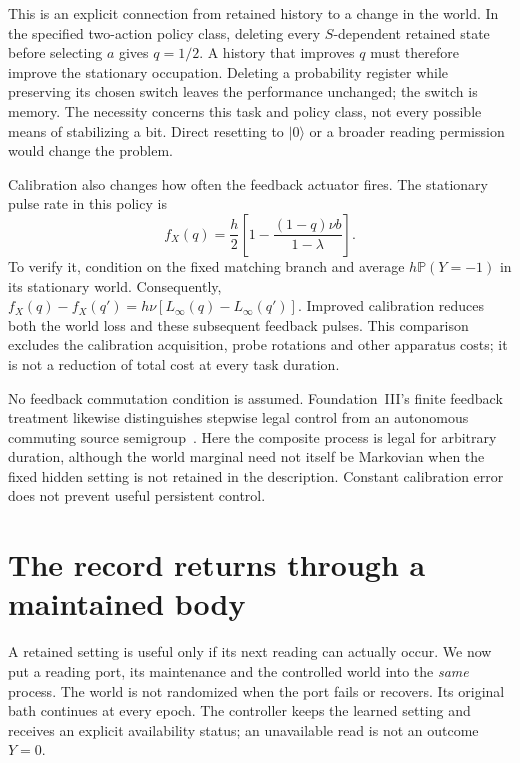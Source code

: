 \documentclass[11pt,a4paper]{article}
\newcommand{\Prb}{\mathbb P}
\begin{document}
This is an explicit connection from retained history to a change in the world. In the specified two-action policy class, deleting every $S$-dependent retained state before selecting $a$ gives $q=1/2$. A history that improves $q$ must therefore improve the stationary occupation. Deleting a probability register while preserving its chosen switch leaves the performance unchanged; the switch is memory. The necessity concerns this task and policy class, not every possible means of stabilizing a bit. Direct resetting to $|0\rangle$ or a broader reading permission would change the problem.

Calibration also changes how often the feedback actuator fires. The stationary pulse rate in this policy is
\begin{equation}\label{eq:pulse}
 f_X(q)=\frac h2\left[1-\frac{(1-q)\nu b}{1-\lambda}\right].
\end{equation}
To verify it, condition on the fixed matching branch and average $h\Prb(Y=-1)$ in its stationary world. Consequently, $f_X(q)-f_X(q')=h\nu[L_\infty(q)-L_\infty(q')]$. Improved calibration reduces both the world loss and these subsequent feedback pulses. This comparison excludes the calibration acquisition, probe rotations and other apparatus costs; it is not a reduction of total cost at every task duration.

No feedback commutation condition is assumed. Foundation~III's finite feedback treatment likewise distinguishes stepwise legal control from an autonomous commuting source semigroup~\cite{FoundationIII}. Here the composite process is legal for arbitrary duration, although the world marginal need not itself be Markovian when the fixed hidden setting is not retained in the description. Constant calibration error does not prevent useful persistent control.

\section{The record returns through a maintained body}
\label{sec:joint-return}

A retained setting is useful only if its next reading can actually
occur. We now put a reading port, its maintenance and the controlled
world into the \emph{same} process. The world is not randomized when
the port fails or recovers. Its original bath continues at every
epoch. The controller keeps the learned setting and receives an
explicit availability status; an unavailable read is not an outcome
$Y=0$.
\end{document}

